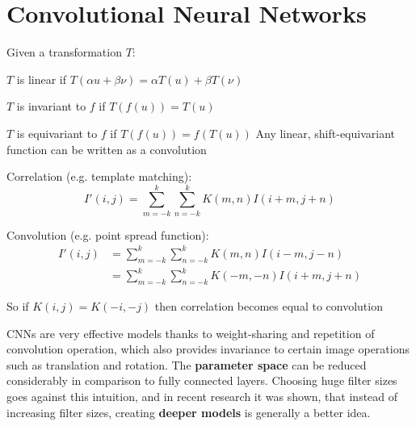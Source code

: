 \documentclass[12pt]{article}
\begin{document}
\section{Convolutional Neural Networks}
\par Given a transformation $T$:
\ulb
\item $T$ is linear if $T (\alpha u + \beta \nu) = \alpha T(u) + \beta T(\nu)$
\item $T$ is invariant to $f$ if $T(f(u)) = T(u)$
\item $T$ is equivariant to $f$ if $T(f(u)) = f(T(u))$
\ule
Any linear, shift-equivariant function can be written as a convolution
\ulb
\item Correlation (e.g. template matching): 
\[ I'(i,j) = \sum_{m=-k}^k \sum_{n=-k}^k K(m,n) I(i+m, j+n) \]
\item Convolution (e.g. point spread function): 
\begin{equation*}
\begin{split}
I'(i,j) &= \sum_{m=-k}^k \sum_{n=-k}^k K(m,n) I(i-m, j-n) \\
&= \sum_{m=-k}^k \sum_{n=-k}^k K(-m,-n) I(i+m, j+n)
\end{split}
\end{equation*}
\item So if $K(i,j) = K(-i,-j)$ then correlation becomes equal to convolution
\ule
\par CNNs are very effective models thanks to weight-sharing and repetition of convolution operation, which also provides invariance to certain image operations such as translation and rotation. The \textbf{parameter space} can be reduced considerably in comparison to fully connected layers. Choosing huge filter sizes goes against this intuition, and in recent research it was shown, that instead of increasing filter sizes, creating \textbf{deeper models} is generally a better idea.
\end{document}

